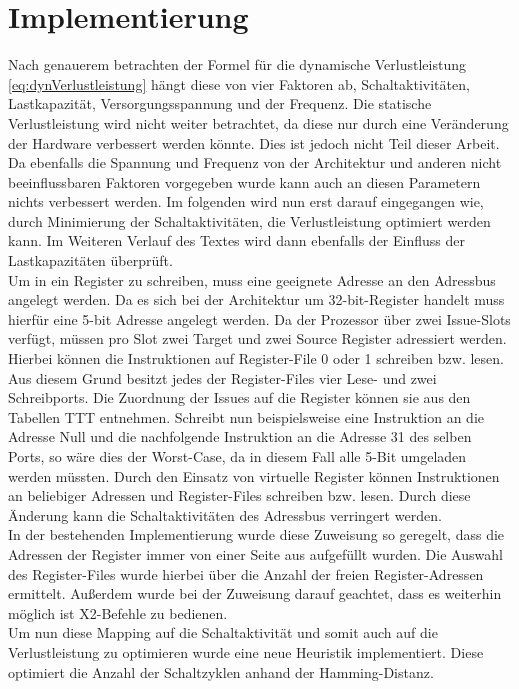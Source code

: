\chapter{Implementierung}
\label{chap:Implementierung}

Nach genauerem betrachten der Formel für die dynamische Verlustleistung \ref{eq:dynVerlustleistung} hängt diese von vier Faktoren ab, Schaltaktivitäten,  Lastkapazität, Versorgungsspannung und der Frequenz. Die statische Verlustleistung wird nicht weiter betrachtet, da diese nur durch eine Veränderung der Hardware verbessert werden könnte. Dies ist jedoch nicht Teil dieser Arbeit. Da ebenfalls die Spannung und Frequenz von der Architektur und anderen nicht beeinflussbaren Faktoren vorgegeben wurde kann auch an diesen Parametern nichts verbessert werden. Im folgenden wird nun erst darauf eingegangen wie, durch Minimierung der Schaltaktivitäten, die Verlustleistung optimiert werden kann. Im Weiteren Verlauf des Textes wird dann ebenfalls der Einfluss der Lastkapazitäten überprüft.\\
Um in ein Register zu schreiben, muss eine geeignete Adresse an den Adressbus angelegt werden. Da es sich bei der Architektur um 32-bit-Register handelt muss hierfür eine 5-bit Adresse angelegt werden.
Da der Prozessor über zwei Issue-Slots verfügt, müssen pro Slot zwei Target und zwei Source Register adressiert werden. Hierbei können die Instruktionen auf Register-File 0 oder 1 schreiben bzw. lesen. Aus diesem Grund besitzt jedes der Register-Files vier Lese- und zwei Schreibports. Die Zuordnung der Issues auf die Register können sie aus den Tabellen TTT entnehmen. Schreibt nun beispielsweise eine Instruktion an die Adresse Null und die nachfolgende Instruktion an die Adresse 31 des selben Ports, so wäre dies der Worst-Case, da in diesem Fall alle 5-Bit umgeladen werden müssten.
Durch den Einsatz von virtuelle Register können Instruktionen an beliebiger Adressen und Register-Files schreiben bzw. lesen. Durch diese Änderung kann die Schaltaktivitäten des Adressbus verringert werden.\\
In der bestehenden Implementierung wurde diese Zuweisung so geregelt, dass die Adressen der Register immer von einer Seite aus aufgefüllt wurden. Die Auswahl des Register-Files wurde hierbei über die Anzahl der freien Register-Adressen ermittelt. Außerdem wurde bei der Zuweisung darauf geachtet, dass es weiterhin möglich ist X2-Befehle zu bedienen.\\
Um nun diese Mapping auf die Schaltaktivität und somit auch auf die Verlustleistung zu optimieren wurde eine neue Heuristik implementiert.
Diese optimiert die Anzahl der Schaltzyklen anhand der Hamming-Distanz. 
